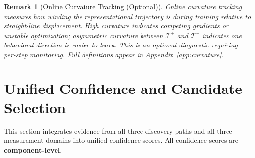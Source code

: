 \documentclass[11pt]{article}
\newtheorem{remark}{Remark}[section]
\begin{document}
\begin{remark}[Online Curvature Tracking (Optional)]
Online curvature tracking measures how winding the representational trajectory is during training relative to straight-line displacement. High curvature indicates competing gradients or unstable optimization; asymmetric curvature between $\mathcal{T}^+$ and $\mathcal{T}^-$ indicates one behavioral direction is easier to learn. This is an optional diagnostic requiring per-step monitoring. Full definitions appear in Appendix~\ref{app:curvature}.
\end{remark}

\section{Unified Confidence and Candidate Selection}
\label{sec:unified-confidence}

This section integrates evidence from all three discovery paths and all three measurement domains into unified confidence scores. All confidence scores are \textbf{component-level}.
\end{document}
